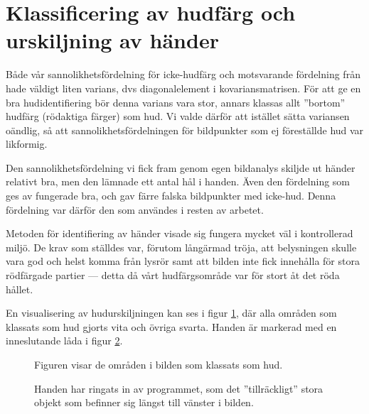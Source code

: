 \documentclass[../rapport_MVEX01-11-05]{subfiles}
\begin{document}
\section{Klassificering av hudfärg och urskiljning av händer}
Både vår sannolikhetsfördelning för icke-hudfärg och motsvarande
fördelning från  hade väldigt liten varians,
dvs diagonalelement i kovariansmatrisen. För att ge en bra
hudidentifiering bör denna varians vara stor, annars klassas allt
''bortom'' hudfärg (rödaktiga färger) som hud. Vi valde därför att
istället sätta variansen oändlig, så att sannolikhetsfördelningen för
bildpunkter som ej föreställde hud var likformig.

Den sannolikhetsfördelning vi fick fram genom egen bildanalys skiljde
ut händer relativt bra, men den lämnade ett antal hål i handen. Även
den fördelning som ges av  fungerade bra, och
gav färre falska bildpunkter med icke-hud. Denna fördelning var därför den som
användes i resten av arbetet. 

Metoden för identifiering av händer visade sig fungera mycket väl i
kontrollerad miljö. De krav som ställdes var, förutom långärmad
tröja, att belysningen skulle vara god och helst komma från lysrör
samt att bilden inte fick innehålla för stora rödfärgade partier --- detta
då vårt hudfärgsområde var för stort åt det röda hållet. 

En visualisering av hudurskiljningen kan ses i figur
\ref{fig:hudklassificering}, där alla områden som klassats som hud
gjorts vita och övriga svarta. Handen är markerad med en inneslutande
låda i figur \ref{fig:boundingbox}.

\begin{figure}
	  \centering
		\caption{Figuren visar de områden i bilden som
                  klassats som hud.}
									\label{fig:hudklassificering}
\end{figure}

\begin{figure}
	  \centering
		\caption{Handen har ringats in av programmet, som det
                  ''tillräckligt'' stora objekt som befinner sig
                  längst till vänster i bilden.}
									\label{fig:boundingbox}
\end{figure}
\end{document}
